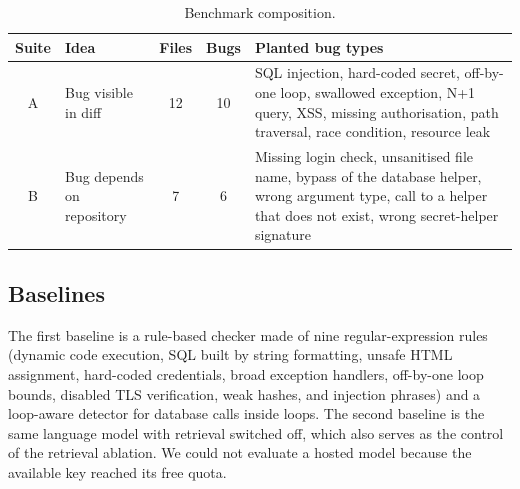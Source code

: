 \documentclass[12pt,onecolumn,draftclsnofoot]{IEEEtran}
\begin{document}
\begin{table}[!t]
\caption{Benchmark composition.}\label{tab:data}
\centering\small
\begin{tabular}{@{}clccp{3.0in}@{}}
\toprule
Suite & Idea & Files & Bugs & Planted bug types \\
\midrule
A & Bug visible in diff & 12 & 10 & SQL injection, hard-coded secret, off-by-one loop, swallowed exception, N+1 query, XSS, missing authorisation, path traversal, race condition, resource leak \\
B & Bug depends on repository & 7 & 6 & Missing login check, unsanitised file name, bypass of the database helper, wrong argument type, call to a helper that does not exist, wrong secret-helper signature \\
\bottomrule
\end{tabular}
\end{table}

\subsection{Baselines}
The first baseline is a rule-based checker made of nine regular-expression rules (dynamic code execution, SQL built by string formatting, unsafe HTML assignment, hard-coded credentials, broad exception handlers, off-by-one loop bounds, disabled TLS verification, weak hashes, and injection phrases) and a loop-aware detector for database calls inside loops. The second baseline is the same language model with retrieval switched off, which also serves as the control of the retrieval ablation. We could not evaluate a hosted model because the available key reached its free quota.
\end{document}
